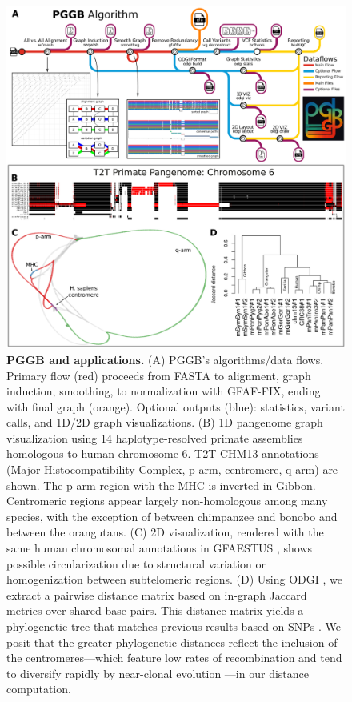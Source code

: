 \documentclass[pdflatex,mathphys]{jnl}%
\theoremstyle{thmstyleone}%
\theoremstyle{thmstyletwo}%
\theoremstyle{thmstylethree}%
\begin{document}
\begin{figure}[htbp!]
	\includegraphics[width=\linewidth]{fig/figure1.pdf}
	\caption{
      \textbf{PGGB and applications.}
      (A) PGGB’s algorithms/data flows.
      Primary flow (red) proceeds from FASTA to alignment, graph induction, smoothing, to normalization with GFAF-FIX, ending with final graph (orange). Optional outputs (blue): statistics, variant calls, and 1D/2D graph visualizations.
      (B) 1D pangenome graph visualization using 14 haplotype-resolved primate assemblies homologous to human chromosome 6.
      T2T-CHM13 annotations (Major Histocompatibility Complex, p-arm, centromere, q-arm) are shown.
      The p-arm region with the MHC is inverted in Gibbon.
      Centromeric regions appear largely non-homologous among many species, with the exception of between chimpanzee and bonobo and between the orangutans.
      (C) 2D visualization, rendered with the same human chromosomal annotations in GFAESTUS \cite{Fischer_2022}, shows possible circularization due to structural variation or homogenization between subtelomeric regions.
      (D) Using ODGI \cite{Guarracino_odgi_2022}, we extract a pairwise distance matrix based on in-graph Jaccard metrics over shared base pairs.
      This distance matrix yields a phylogenetic tree that matches previous results based on SNPs \cite{Cagan_2016}.
      We posit that the greater phylogenetic distances reflect the inclusion of the centromeres---which feature low rates of recombination and tend to diversify rapidly by near-clonal evolution \cite{Logsdon2021}---in our distance computation.
    }
	\label{fig:pggb}
\end{figure}
\end{document}
